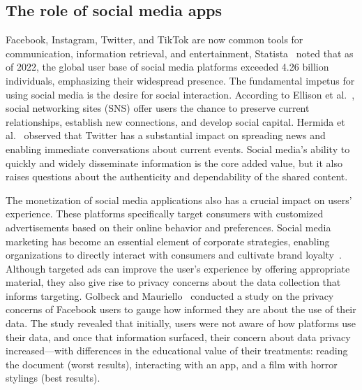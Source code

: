 \subsection{The role of social media apps}


Facebook, Instagram, Twitter, and TikTok are now common tools for communication, information retrieval, and entertainment, 
Statista~\cite{statista} noted that as of 2022, the global user base of social media platforms exceeded 4.26 billion individuals, emphasizing their widespread presence.
The fundamental impetus for using social media is the desire for social interaction.
According to Ellison et al.~\cite{ellison2007benefits}, social networking sites (SNS) offer users the chance to preserve current relationships, establish new connections, and develop social capital.
Hermida et al.~\cite{hermida2012share} observed that Twitter has a substantial impact on spreading news and enabling immediate conversations about current events.
Social media's ability to quickly and widely disseminate information is the core added value, but it also raises questions about the authenticity and dependability of the shared content.


The monetization of social media applications also has a crucial impact on users' experience.
These platforms specifically target consumers with customized advertisements based on their online behavior and preferences.
Social media marketing has become an essential element of corporate strategies, enabling organizations to directly interact with consumers and cultivate brand loyalty~\cite{kaplan2010users}.
Although targeted ads can improve the user's experience by offering appropriate material, they also give rise to privacy concerns about the data collection that informs targeting.
Golbeck and Mauriello~\cite{golbeck2016} conducted a study on the privacy concerns of Facebook users to gauge how informed they are about the use of their data.
The study revealed that initially, users were not aware of how platforms use their data, and once that information surfaced, their concern about data privacy increased---with differences in the educational value of their treatments:
reading the document (worst results), interacting with an app, and a film with horror stylings (best results).

